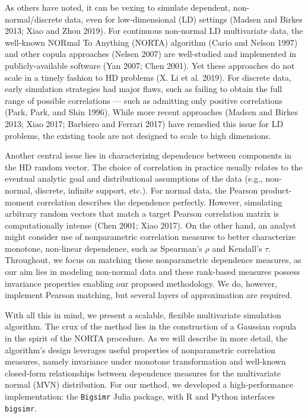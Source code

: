 \documentclass{article}
\begin{document}
As others have noted, it can be vexing to simulate dependent,
non-normal/discrete data, even for low-dimensional (LD) settings (Madsen
and Birkes 2013; Xiao and Zhou 2019). For continuous non-normal LD
multivariate data, the well-known NORmal To Anything (NORTA) algorithm
(Cario and Nelson 1997) and other copula approaches (Nelsen 2007) are
well-studied and implemented in publicly-available software (Yan 2007;
Chen 2001). Yet these approaches do not scale in a timely fashion to HD
problems (X. Li et al. 2019). For discrete data, early simulation
strategies had major flaws, such as failing to obtain the full range of
possible correlations --- such as admitting only positive correlations
(Park, Park, and Shin 1996). While more recent approaches (Madsen and
Birkes 2013; Xiao 2017; Barbiero and Ferrari 2017) have remedied this
issue for LD problems, the existing tools are not designed to scale to
high dimensions.

Another central issue lies in characterizing dependence between
components in the HD random vector. The choice of correlation in
practice usually relates to the eventual analytic goal and
distributional assumptions of the data (e.g., non-normal, discrete,
infinite support, etc.). For normal data, the Pearson product-moment
correlation describes the dependence perfectly. However, simulating
arbitrary random vectors that match a target Pearson correlation matrix
is computationally intense (Chen 2001; Xiao 2017). On the other hand, an
analyst might consider use of nonparametric correlation measures to
better characterize monotone, non-linear dependence, such as Spearman's
\(\rho\) and Kendall's \(\tau\). Throughout, we focus on matching these
nonparametric dependence measures, as our aim lies in modeling
non-normal data and these rank-based measures possess invariance
properties enabling our proposed methodology. We do, however, implement
Pearson matching, but several layers of approximation are required.

With all this in mind, we present a scalable, flexible multivariate
simulation algorithm. The crux of the method lies in the construction of
a Gaussian copula in the spirit of the NORTA procedure. As we will
describe in more detail, the algorithm's design leverages useful
properties of nonparametric correlation measures, namely invariance
under monotone transformation and well-known closed-form relationships
between dependence measures for the multivariate normal (MVN)
distribution. For our method, we developed a high-performance
implementation: the \texttt{Bigsimr} Julia package, with R and Python
interfaces \texttt{bigsimr}.
\end{document}
